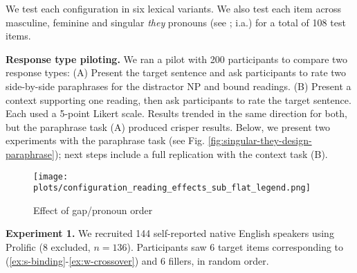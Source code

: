 \documentclass[12pt,letterpaper]{article}
\newcommand{\sectitle}[1]{\smallskip \textbf{#1.}}
\begin{document}
We test each configuration in six lexical variants. %
We also test each item across masculine, feminine and singular \emph{they} pronouns (see \citealp{bjorkman_singular_2017,conrod_pronouns_2019}; i.a.) for a total of 108 test items.

\sectitle{Response type piloting} We ran a pilot with 200 participants to compare two response types: (A) Present the target sentence and ask participants to rate two side-by-side paraphrases for the distractor NP and bound readings. (B) Present a context supporting one reading, then ask participants to rate the target sentence. Each used a 5-point Likert scale. Results trended in the same direction for both, but the paraphrase task (A) produced crisper results. 
Below, we present two experiments with the paraphrase task (see Fig. \ref{fig:singular-they-design-paraphrase}); next steps include a full replication %
with the context task (B).

\begin{wrapfigure}{r}{0.48\textwidth}
\centering
\texttt{[image: plots/configuration\_reading\_effects\_sub\_flat\_legend.png]}
\caption{Effect of gap/pronoun order}
\label{fig:exp-1-binding-crossover}
\end{wrapfigure}

\sectitle{Experiment 1} %
We recruited 144 self-reported native English speakers using Prolific (8 excluded, $n = 136$). %
Participants %
saw %
6 target items corresponding to (\ref{ex:s-binding}-\ref{ex:w-crossover}) %
and 6 fillers, in random order.
\end{document}
